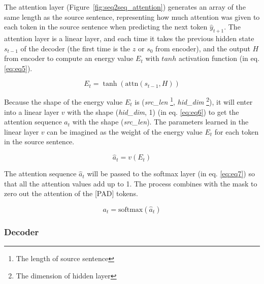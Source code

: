 The attention layer (Figure~\ref{fig:seq2seq_attention}) generates an array of the same length as the source sentence, representing how much attention was given to each token in the source sentence when predicting the next token $\hat{y}_{t+1}$. The attention layer is a linear layer, and each time it takes the previous hidden state $s_{t-1}$ of the decoder (the first time is the $z$ or $s_0$ from encoder), and the output $H$ from encoder to compute an energy value $E_t$ with $tanh$ activation function (in eq. \ref{eq:eq5}).

\begin{equation}
    E_t = \tanh(\text{attn}(s_{t-1}, H)) \label{eq:eq5}
\end{equation}

Because the shape of the energy value $E_t$ is (\textit{src\_len} \footnote{The length of source sentence}, \textit{hid\_dim} \footnote{The dimension of hidden layer}), it will enter into a linear layer $v$ with the shape (\textit{hid\_dim}, 1) (in eq. \ref{eq:eq6}) to get the attention sequence $\hat{a}_t$ with the shape (\textit{src\_len}). The parameters learned in the linear layer $v$ can be imagined as the weight of the energy value $E_t$ for each token in the source sentence.

\begin{equation}
     \hat{a}_t = v(E_t) \label{eq:eq6}
\end{equation}

The attention sequence $\hat{a}_t$ will be passed to the softmax layer (in eq. \ref{eq:eq7}) so that all the attention values add up to 1. The process combines with the mask to zero out the attention of the [PAD] tokens. 

\begin{equation}
a_t = \text{softmax}(\hat{a}_t) \label{eq:eq7}
\end{equation}

\subsubsection{Decoder}

